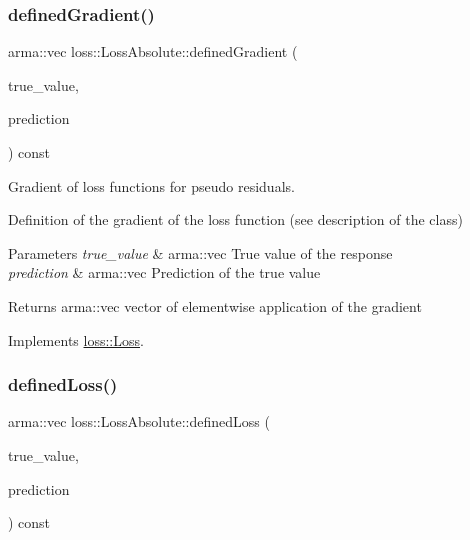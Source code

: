 \mbox{\label{classloss_1_1_loss_absolute_a89e530450e42f20fc060ed9141fa8c04}} 
\subsubsection{\texorpdfstring{defined\+Gradient()}{definedGradient()}}
{\footnotesize\ttfamily arma\+::vec loss\+::\+Loss\+Absolute\+::defined\+Gradient (\begin{DoxyParamCaption}\item[{const arma\+::vec \&}]{true\+\_\+value,  }\item[{const arma\+::vec \&}]{prediction }\end{DoxyParamCaption}) const\hspace{0.3cm}{\ttfamily [virtual]}}



Gradient of loss functions for pseudo residuals. 

Definition of the gradient of the loss function (see description of the class)


\begin{DoxyParams}{Parameters}
{\em true\+\_\+value} & {\ttfamily arma\+::vec} True value of the response \\
\hline
{\em prediction} & {\ttfamily arma\+::vec} Prediction of the true value\\
\hline
\end{DoxyParams}
\begin{DoxyReturn}{Returns}
{\ttfamily arma\+::vec} vector of elementwise application of the gradient 
\end{DoxyReturn}


Implements \hyperlink{classloss_1_1_loss_a267a4de70747ade4b2d84ce35a448979}{loss\+::\+Loss}.

\mbox{\label{classloss_1_1_loss_absolute_af10b320d7253ef4f566530717441059e}} 
\subsubsection{\texorpdfstring{defined\+Loss()}{definedLoss()}}
{\footnotesize\ttfamily arma\+::vec loss\+::\+Loss\+Absolute\+::defined\+Loss (\begin{DoxyParamCaption}\item[{const arma\+::vec \&}]{true\+\_\+value,  }\item[{const arma\+::vec \&}]{prediction }\end{DoxyParamCaption}) const\hspace{0.3cm}{\ttfamily [virtual]}}



